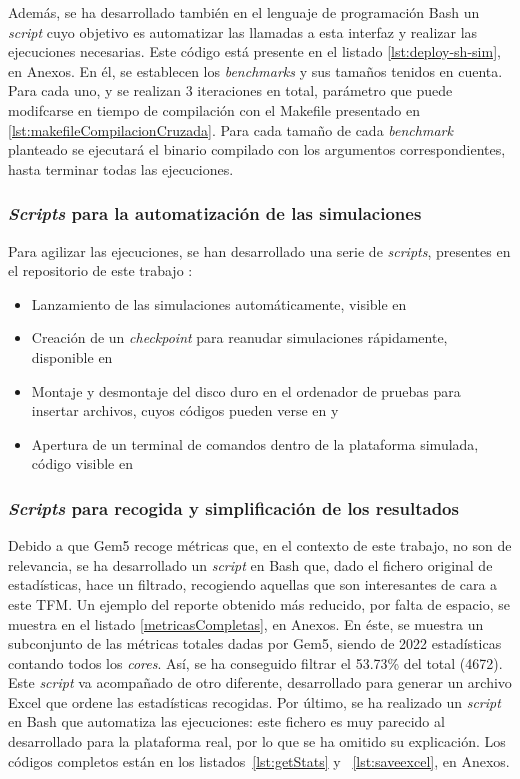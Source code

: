 Además, se ha desarrollado también en el lenguaje de programación Bash un \textit{script} cuyo objetivo es automatizar las llamadas a esta interfaz y realizar las ejecuciones necesarias. Este código está presente en el listado \ref{lst:deploy-sh-sim}, en Anexos. En él, se establecen los \textit{benchmarks} y sus tamaños tenidos en cuenta. Para cada uno, y se realizan 3 iteraciones en total, parámetro que puede modifcarse en tiempo de compilación con el Makefile presentado en \ref{lst:makefileCompilacionCruzada}. Para cada tamaño de cada \textit{benchmark} planteado se ejecutará el binario compilado con los argumentos correspondientes, hasta terminar todas las ejecuciones.

\subsubsection{\textit{Scripts} para la automatización de las simulaciones}

Para agilizar las ejecuciones, se han desarrollado una serie de \textit{scripts}, presentes en el repositorio de este trabajo \cite{repoTFM}:

\begin{itemize}
    \item Lanzamiento de las simulaciones automáticamente, visible en \cite{repoTFM-lanzarSimulacion}
    \item Creación de un \textit{checkpoint} para reanudar simulaciones rápidamente, disponible en \cite{repoTFM-crearCheckpoint}
    \item Montaje y desmontaje del disco duro en el ordenador de pruebas para insertar archivos, cuyos códigos pueden verse en \cite{repoTFM-montarImagen} y \cite{repoTFM-desmontarImagen}
    \item Apertura de un terminal de comandos dentro de la plataforma simulada, código visible en \cite{repoTFM-abrirTerminal}
\end{itemize}

\subsubsection{\textit{Scripts} para recogida y simplificación de los resultados}

Debido a que Gem5 recoge métricas que, en el contexto de este trabajo, no son de relevancia, se ha desarrollado un \textit{script} en Bash que, dado el fichero original de estadísticas, hace un filtrado, recogiendo aquellas que son interesantes de cara a este \ac{TFM}. Un ejemplo del reporte obtenido más reducido, por falta de espacio, se muestra en el listado \ref{metricasCompletas}, en Anexos. En éste, se muestra un subconjunto de las métricas totales dadas por Gem5, siendo de 2022 estadísticas contando todos los \textit{cores}. Así, se ha conseguido filtrar el 53.73\% del total (4672). Este \textit{script} va acompañado de otro diferente, desarrollado para generar un archivo Excel que ordene las estadísticas recogidas. Por último, se ha realizado un \textit{script} en Bash que automatiza las ejecuciones: este fichero es muy parecido al desarrollado para la plataforma real, por lo que se ha omitido su explicación. Los códigos completos están en los listados~\ref{lst:getStats} y ~\ref{lst:saveexcel}, en Anexos.

